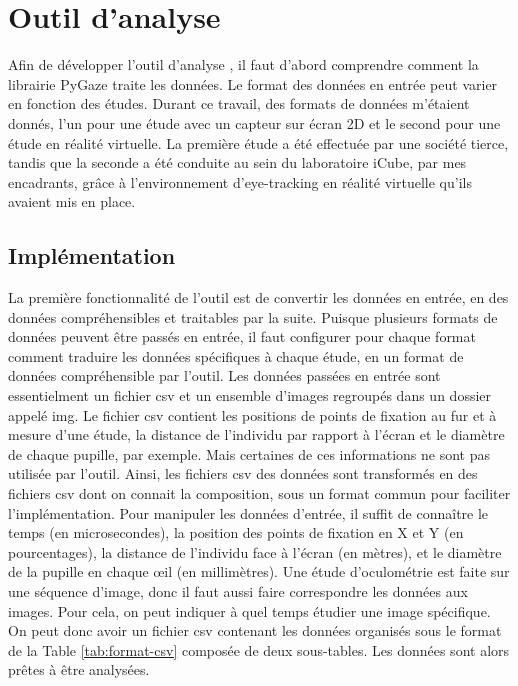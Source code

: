 \documentclass[hidelinks,12pt]{article}
\begin{document}

\section{Outil d'analyse}

Afin de développer l'outil d'analyse \cite{github_ter}, il faut d'abord
comprendre comment la librairie PyGaze traite les données. Le format des
données en entrée peut varier en fonction des études. Durant ce travail, des
formats de données m'étaient donnés, l'un pour une étude avec un capteur sur
écran 2D et le second pour une étude en réalité virtuelle. La première étude a
été effectuée par une société tierce, tandis que la seconde a été conduite au
sein du laboratoire iCube, par mes encadrants, grâce à l'environnement 
d'eye-tracking en réalité virtuelle qu'ils avaient mis en place.

\subsection{Implémentation}

La première fonctionnalité de l'outil est de convertir les données en entrée,
en des données compréhensibles et traitables par la suite. Puisque plusieurs
formats de données peuvent être passés en entrée, il faut configurer pour
chaque format comment traduire les données spécifiques à chaque étude, en un
format de données compréhensible par l'outil. Les données passées en entrée
sont essentielment un fichier csv et un ensemble d'images regroupés dans un
dossier appelé img. Le fichier csv contient les positions de points de fixation
au fur et à mesure d'une étude, la distance de l'individu par rapport à l'écran
et le diamètre de chaque pupille, par exemple. Mais certaines de ces
informations ne sont pas utilisée par l'outil. Ainsi, les fichiers csv des
données sont transformés en des fichiers csv dont on connait la composition,
sous un format commun pour faciliter l'implémentation. Pour manipuler les
données d'entrée, il suffit de connaître le temps (en microsecondes), la
position des points de fixation en X et Y (en pourcentages), la distance de
l'individu face à l'écran (en mètres), et le diamètre de la pupille en chaque
œil (en millimètres). Une étude d'oculométrie est faite sur une séquence
d'image, donc il faut aussi faire correspondre les données aux images. Pour
cela, on peut indiquer à quel temps étudier une image spécifique. On peut donc
avoir un fichier csv contenant les données organisés sous le format de la Table
\ref{tab:format-csv} composée de deux sous-tables. Les données sont alors
prêtes à être analysées.
\end{document}
